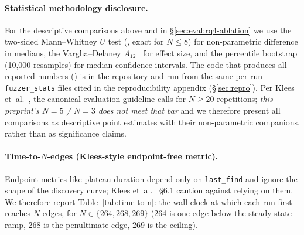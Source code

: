 \documentclass[11pt]{article}
\begin{document}
\paragraph{Statistical methodology disclosure.}
\label{sec:eval:rq1:stats}
For the descriptive comparisons above and in
\S\ref{sec:eval:rq4-ablation} we use the two-sided Mann--Whitney
$U$ test (, exact for
$N{\leq}8$) for non-parametric difference in medians, the
Vargha--Delaney $A_{12}$~\cite{vargha2000critique} for effect
size, and the percentile bootstrap (10{,}000 resamples) for
median confidence intervals. The code that produces all reported
numbers () is in the
repository and run from the same per-run \texttt{fuzzer\_stats}
files cited in the reproducibility appendix
(\S\ref{sec:repro}). Per
Klees et~al.~\cite{klees2018evaluating}, the canonical evaluation
guideline calls for $N{\geq}20$ repetitions; \emph{this preprint's
$N{=}5$ / $N{=}3$ does not meet that bar} and we therefore present
all comparisons as descriptive point estimates with their
non-parametric companions, rather than as significance claims.

\paragraph{Time-to-$N$-edges (Klees-style endpoint-free metric).}
Endpoint metrics like plateau duration depend only on
\texttt{last\_find} and ignore the shape of the discovery curve;
Klees et~al.~\cite{klees2018evaluating} \S6.1 caution against
relying on them. We therefore report
Table~\ref{tab:time-to-n}: the wall-clock at which each run
first reaches $N$ edges, for $N \in \{264, 268, 269\}$
(264 is one edge below the steady-state ramp, 268 is the
penultimate edge, 269 is the ceiling).
\end{document}
